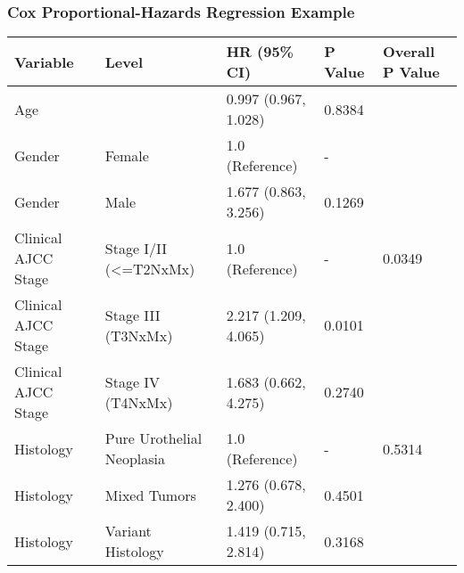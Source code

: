 \documentclass[table]{article}
\newenvironment{Shaded}{\begin{snugshade}}{\end{snugshade}}
\newcommand{\CommentTok}[1]{\textcolor[rgb]{0.56,0.35,0.01}{\textit{#1}}}
\newcommand{\DataTypeTok}[1]{\textcolor[rgb]{0.13,0.29,0.53}{#1}}
\newcommand{\KeywordTok}[1]{\textcolor[rgb]{0.13,0.29,0.53}{\textbf{#1}}}
\newcommand{\NormalTok}[1]{#1}
\newcommand{\OperatorTok}[1]{\textcolor[rgb]{0.81,0.36,0.00}{\textbf{#1}}}
\newcommand{\StringTok}[1]{\textcolor[rgb]{0.31,0.60,0.02}{#1}}
\begin{document}
\clearpage

\hypertarget{cox-proportional-hazards-regression-example}{%
\subsubsection{Cox Proportional-Hazards Regression
Example}\label{cox-proportional-hazards-regression-example}}

\begin{Shaded}
\end{Shaded}

\begin{tabular}{l|l|l|l|l}
\hline
Variable & Level & HR (95\% CI) & P Value & Overall P Value\\
\hline
Age &  & 0.997 (0.967, 1.028) & 0.8384 & \\
\hline
Gender & Female & 1.0 (Reference) & - & \\
\hline
Gender & Male & 1.677 (0.863, 3.256) & 0.1269 & \\
\hline
Clinical AJCC Stage & Stage I/II (<=T2NxMx) & 1.0 (Reference) & - & 0.0349\\
\hline
Clinical AJCC Stage & Stage III (T3NxMx) & 2.217 (1.209, 4.065) & 0.0101 & \\
\hline
Clinical AJCC Stage & Stage IV (T4NxMx) & 1.683 (0.662, 4.275) & 0.2740 & \\
\hline
Histology & Pure Urothelial Neoplasia & 1.0 (Reference) & - & 0.5314\\
\hline
Histology & Mixed Tumors & 1.276 (0.678, 2.400) & 0.4501 & \\
\hline
Histology & Variant Histology & 1.419 (0.715, 2.814) & 0.3168 & \\
\hline
\end{tabular}
\end{document}
